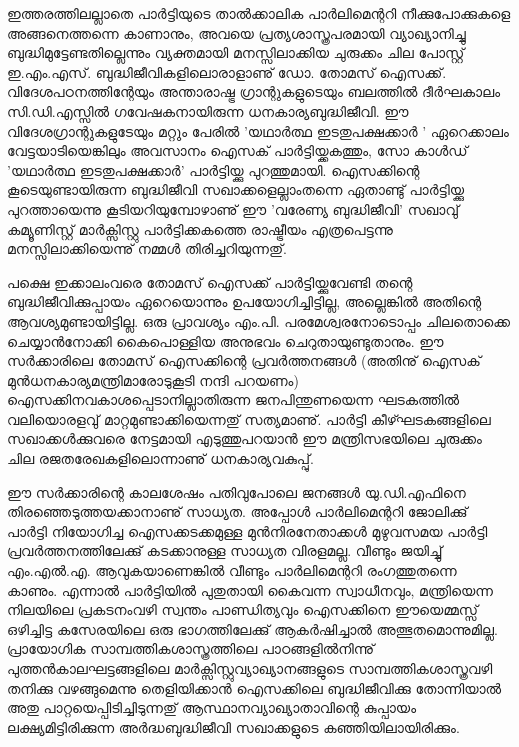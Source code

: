 ഇത്തരത്തിലല്ലാതെ പാര്‍ട്ടിയുടെ താല്‍ക്കാലിക പാര്‍ലിമെന്ററി നീക്കുപോക്കുകളെ അങ്ങനെത്തന്നെ കാണാനും,
അവയെ പ്രത്യശാസ്ത്രപരമായി വ്യാഖ്യാനിച്ചു ബുദ്ധിമുട്ടേണ്ടതില്ലെന്നും വ്യക്തമായി മനസ്സിലാക്കിയ ചുരുക്കം ചില പോസ്റ്റ്
ഇ.എം.എസ്. ബുദ്ധിജീവികളിലൊരാളാണു് ഡോ. തോമസ് ഐസക്ക്. വിദേശപഠനത്തിന്റേയും അന്താരാഷ്ട്ര ഗ്രാന്റുകളുടെയും
ബലത്തില്‍ ദീര്‍ഘകാലം സി.ഡി.എസ്സില്‍ ഗവേഷകനായിരുന്ന ധനകാര്യബുദ്ധിജീവി. ഈ വിദേശഗ്രാന്റുകളുടേയും മറ്റും 
പേരില്‍ 'യഥാര്‍ത്ഥ ഇടതുപക്ഷക്കാര്‍ ' ഏറെക്കാലം വേട്ടയാടിയെങ്കിലും അവസാനം ഐസക് പാര്‍ട്ടിയ്ക്കകത്തും, സോ 
കാള്‍ഡ് 'യഥാര്‍ത്ഥ ഇടതുപക്ഷക്കാര്‍' പാര്‍ട്ടിയ്ക്കു പുറത്തുമായി. ഐസക്കിന്റെ കൂടെയുണ്ടായിരുന്ന ബുദ്ധിജീവി 
സഖാക്കളെല്ലാംതന്നെ ഏതാണ്ടു് പാര്‍ട്ടിയ്ക്കു പുറത്തായെന്നു കൂടിയറിയുമ്പോഴാണു് ഈ 'വരേണ്യ ബുദ്ധിജീവി' സഖാവു് 
കമ്യൂണിസ്റ്റ് മാര്‍ക്സിസ്റ്റു പാര്‍ട്ടിക്കകത്തെ രാഷ്ട്രീയം എത്രപെട്ടന്നു മനസ്സിലാക്കിയെന്നു് നമ്മള്‍ തിരിച്ചറിയുന്നതു്.

പക്ഷെ ഇക്കാലംവരെ തോമസ് ഐസക്ക് പാര്‍ട്ടിയ്ക്കുവേണ്ടി തന്റെ ബുദ്ധിജീവിക്കുപ്പായം ഏറെയൊന്നും ഉപയോഗിച്ചിട്ടില്ല, 
അല്ലെങ്കില്‍ അതിന്റെ ആവശ്യമുണ്ടായിട്ടില്ല. ഒരു പ്രാവശ്യം എം.പി. പരമേശ്വരനോടൊപ്പം ചിലതൊക്കെ ചെയ്യാന്‍നോക്കി
കൈപൊള്ളിയ അനുഭവം ചെറുതായുണ്ടുതാനും. ഈ സര്‍ക്കാരിലെ തോമസ് ഐസക്കിന്റെ പ്രവര്‍ത്തനങ്ങള്‍ (അതിനു്
ഐസക് മുന്‍ധനകാര്യമന്ത്രിമാരോടുകൂടി നന്ദി പറയണം) ഐസക്കിനവകാശപ്പെടാനില്ലാതിരുന്ന ജനപിന്തുണയെന്ന 
ഘടകത്തില്‍ വലിയൊരളവു് മാറ്റമുണ്ടാക്കിയെന്നതു് സത്യമാണു്. പാര്‍ട്ടി കീഴ്ഘടകങ്ങളിലെ സഖാക്കള്‍ക്കുവരെ നേട്ടമായി
എടുത്തുപറയാന്‍ ഈ മന്ത്രിസഭയിലെ ചുരുക്കം ചില രജതരേഖകളിലൊന്നാണു് ധനകാര്യവകുപ്പു്.

ഈ സര്‍ക്കാരിന്റെ കാലശേഷം പതിവുപോലെ ജനങ്ങള്‍ യു.ഡി.എഫിനെ തിരഞ്ഞെടുത്തയക്കാനാണു് സാധ്യത. അപ്പോള്‍
പാര്‍ലിമെന്ററി ജോലിക്കു് പാര്‍ട്ടി നിയോഗിച്ച ഐസക്കടക്കമുള്ള മുന്‍നിരനേതാക്കള്‍ മുഴുവസമയ പാര്‍ട്ടി 
പ്രവര്‍ത്തനത്തിലേക്കു് കടക്കാനുള്ള സാധ്യത വിരളമല്ല. വീണ്ടും ജയിച്ചു് എം.എല്‍.എ. ആവുകയാണെങ്കില്‍ വീണ്ടും 
പാര്‍ലിമെന്ററി രംഗത്തുതന്നെ കാണും. എന്നാല്‍ പാര്‍ട്ടിയില്‍ പുതുതായി കൈവന്ന സ്വാധീനവും, മന്ത്രിയെന്ന നിലയിലെ 
പ്രകടനംവഴി സ്വന്തം പാണ്ഡിത്യവും ഐസക്കിനെ ഈയെമ്മസ്സ് ഒഴിച്ചിട്ട കസേരയിലെ ഒരു ഭാഗത്തിലേക്കു് ആകര്‍ഷിച്ചാല്‍
അത്ഭുതമൊന്നുമില്ല. പ്രായോഗിക സാമ്പത്തികശാസ്ത്രത്തിലെ പാഠങ്ങളില്‍നിന്നു് പുത്തന്‍കാലഘട്ടങ്ങളിലെ 
മാര്‍ക്സിസ്റ്റുവ്യാഖ്യാനങ്ങളുടെ സാമ്പത്തികശാസ്ത്രവഴി തനിക്കു വഴങ്ങുമെന്നു തെളിയിക്കാന്‍ ഐസക്കിലെ ബുദ്ധിജീവിക്കു തോന്നിയാല്‍ 
അതു പാറ്റയെപ്പിടിച്ചിടുന്നതു് ആസ്ഥാനവ്യാഖ്യാതാവിന്റെ കുപ്പായം ലക്ഷ്യമിട്ടിരിക്കുന്ന 
അര്‍ദ്ധബുദ്ധിജീവി സഖാക്കളുടെ കഞ്ഞിയിലായിരിക്കും.

